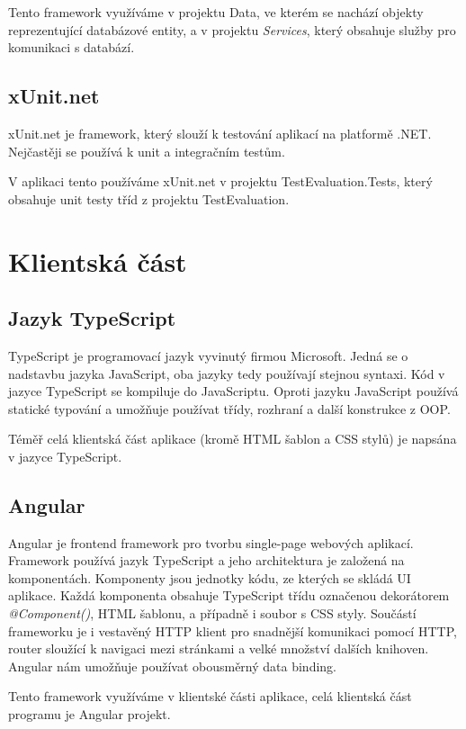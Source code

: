 Tento framework využíváme v projektu Data, ve kterém se nachází objekty reprezentující databázové entity, a v projektu \textit{Services}, který obsahuje služby pro komunikaci s databází.

\subsection{xUnit.net}
xUnit.net je framework, který slouží k testování aplikací na platformě .NET. Nejčastěji se používá k unit a integračním testům. 
\cite{xUnitDocs}

V aplikaci tento používáme xUnit.net v projektu TestEvaluation.Tests, který obsahuje unit testy tříd z projektu TestEvaluation.

\section{Klientská část}

\subsection{Jazyk TypeScript}
TypeScript je programovací jazyk vyvinutý firmou Microsoft. Jedná se o nadstavbu jazyka JavaScript, oba jazyky tedy používají stejnou syntaxi. Kód v jazyce TypeScript se kompiluje do JavaScriptu.
Oproti jazyku JavaScript používá statické typování a umožňuje používat třídy, rozhraní a další konstrukce z OOP. 
\cite{TypescriptDocs}

Téměř celá klientská část aplikace (kromě HTML šablon a CSS stylů) je napsána v jazyce TypeScript.

\subsection{Angular}
Angular je frontend framework pro tvorbu single-page webových aplikací. Framework používá jazyk TypeScript a jeho architektura je založená na komponentách.
Komponenty jsou jednotky kódu, ze kterých se skládá UI aplikace. Každá komponenta obsahuje TypeScript třídu označenou dekorátorem \textit{@Component()}, HTML šablonu, a případně i soubor s CSS styly. 
Součástí frameworku je i vestavěný HTTP klient pro snadnější komunikaci pomocí HTTP, router sloužící k navigaci mezi stránkami a velké množství dalších knihoven. Angular nám umožňuje používat obousměrný data binding.
\cite{AngularDocs}

Tento framework využíváme v klientské části aplikace, celá klientská část programu je Angular projekt.

